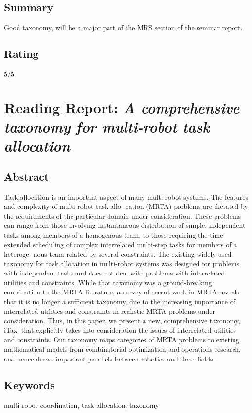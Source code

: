     \subsection*{Summary}
    Good taxonomy, will be a major part of the MRS section of the seminar report.
    \subsection*{Rating}
    5/5
    
    \newpage

    \section{Reading Report: \emph{A comprehensive taxonomy for multi-robot task allocation}}
    \cite{Korsah2013}
    
    \subsection*{Abstract}
    Task allocation is an important aspect of many multi-robot systems. The features and complexity of multi-robot task allo-
    cation (MRTA) problems are dictated by the requirements of the particular domain under consideration. These problems
    can range from those involving instantaneous distribution of simple, independent tasks among members of a homogenous
    team, to those requiring the time-extended scheduling of complex interrelated multi-step tasks for members of a heteroge-
    nous team related by several constraints. The existing widely used taxonomy for task allocation in multi-robot systems was
    designed for problems with independent tasks and does not deal with problems with interrelated utilities and constraints.
    While that taxonomy was a ground-breaking contribution to the MRTA literature, a survey of recent work in MRTA reveals
    that it is no longer a sufficient taxonomy, due to the increasing importance of interrelated utilities and constraints in
    realistic MRTA problems under consideration. Thus, in this paper, we present a new, comprehensive taxonomy, iTax, that
    explicitly takes into consideration the issues of interrelated utilities and constraints. Our taxonomy maps categories of
    MRTA problems to existing mathematical models from combinatorial optimization and operations research, and hence
    draws important parallels between robotics and these fields.
    
    \subsection*{Keywords}
    multi-robot coordination, task allocation, taxonomy
    
